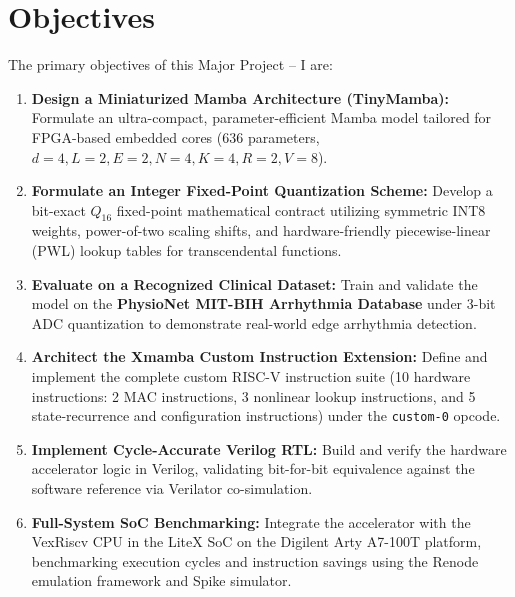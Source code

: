 \documentclass[11pt,a4paper,oneside]{report}
\begin{document}
\section{Objectives}
The primary objectives of this Major Project -- I are:
\begin{enumerate}
    \item \textbf{Design a Miniaturized Mamba Architecture (TinyMamba):} Formulate an ultra-compact, parameter-efficient Mamba model tailored for FPGA-based embedded cores ($636$ parameters, $d=4, L=2, E=2, N=4, K=4, R=2, V=8$).
    \item \textbf{Formulate an Integer Fixed-Point Quantization Scheme:} Develop a bit-exact $Q_{16}$ fixed-point mathematical contract utilizing symmetric INT8 weights, power-of-two scaling shifts, and hardware-friendly piecewise-linear (PWL) lookup tables for transcendental functions.
    \item \textbf{Evaluate on a Recognized Clinical Dataset:} Train and validate the model on the \textbf{PhysioNet MIT-BIH Arrhythmia Database} under 3-bit ADC quantization to demonstrate real-world edge arrhythmia detection.
    \item \textbf{Architect the Xmamba Custom Instruction Extension:} Define and implement the complete custom RISC-V instruction suite (10 hardware instructions: 2 MAC instructions, 3 nonlinear lookup instructions, and 5 state-recurrence and configuration instructions) under the \texttt{custom-0} opcode.
    \item \textbf{Implement Cycle-Accurate Verilog RTL:} Build and verify the hardware accelerator logic in Verilog, validating bit-for-bit equivalence against the software reference via Verilator co-simulation.
    \item \textbf{Full-System SoC Benchmarking:} Integrate the accelerator with the VexRiscv CPU in the LiteX SoC on the Digilent Arty A7-100T platform, benchmarking execution cycles and instruction savings using the Renode emulation framework and Spike simulator.
\end{enumerate}
\end{document}
